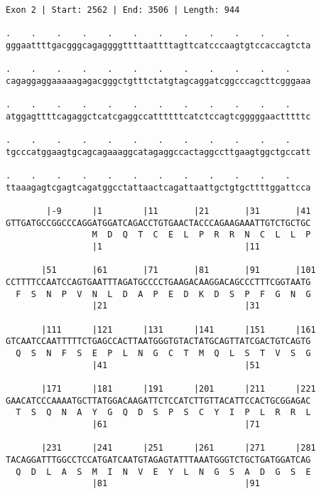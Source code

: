 \documentclass{article}
\begin{document}
\begin{Verbatim}
Exon 2 | Start: 2562 | End: 3506 | Length: 944
 
.    .    .    .    .    .    .    .    .    .    .    .    
gggaattttgacgggcagaggggttttaattttagttcatcccaagtgtccaccagtcta
                                                            
.    .    .    .    .    .    .    .    .    .    .    .    
cagaggaggaaaaagagacgggctgtttctatgtagcaggatcggcccagcttcgggaaa
                                                            
.    .    .    .    .    .    .    .    .    .    .    .    
atggagttttcagaggctcatcgaggccattttttcatctccagtcgggggaactttttc
                                                            
.    .    .    .    .    .    .    .    .    .    .    .    
tgcccatggaagtgcagcagaaaggcatagaggccactaggccttgaagtggctgccatt
                                                            
.    .    .    .    .    .    .    .    .    .    .    .    
ttaaagagtcgagtcagatggcctattaactcagattaattgctgtgcttttggattcca
                                                            
        |-9      |1        |11       |21       |31       |41
GTTGATGCCGGCCCAGGATGGATCAGACCTGTGAACTACCCAGAAGAAATTGTCTGCTGC
                 M  D  Q  T  C  E  L  P  R  R  N  C  L  L  P
                 |1                            |11          
  
       |51       |61       |71       |81       |91       |101
CCTTTTCCAATCCAGTGAATTTAGATGCCCCTGAAGACAAGGACAGCCCTTTCGGTAATG
  F  S  N  P  V  N  L  D  A  P  E  D  K  D  S  P  F  G  N  G
                 |21                           |31          
  
       |111      |121      |131      |141      |151      |161
GTCAATCCAATTTTTCTGAGCCACTTAATGGGTGTACTATGCAGTTATCGACTGTCAGTG
  Q  S  N  F  S  E  P  L  N  G  C  T  M  Q  L  S  T  V  S  G
                 |41                           |51          
  
       |171      |181      |191      |201      |211      |221
GAACATCCCAAAATGCTTATGGACAAGATTCTCCATCTTGTTACATTCCACTGCGGAGAC
  T  S  Q  N  A  Y  G  Q  D  S  P  S  C  Y  I  P  L  R  R  L
                 |61                           |71          
  
       |231      |241      |251      |261      |271      |281
TACAGGATTTGGCCTCCATGATCAATGTAGAGTATTTAAATGGGTCTGCTGATGGATCAG
  Q  D  L  A  S  M  I  N  V  E  Y  L  N  G  S  A  D  G  S  E
                 |81                           |91          
  

\end{Verbatim}
\end{document}
